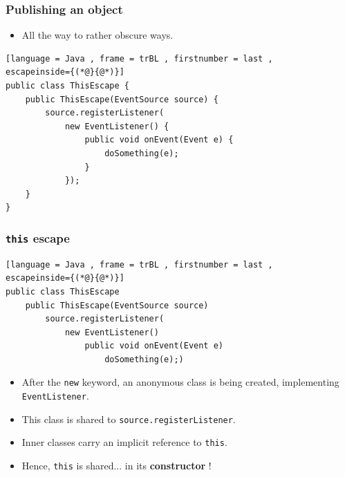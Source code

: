\documentclass[xcolor={dvipsnames,svgnames},aspectratio=169]{beamer}
\begin{document}
\begin{frame}[fragile]
  \frametitle{Publishing an object}

  \begin{itemize}
  \item[\faBook]<1-> All the way to rather obscure ways.
  \end{itemize}
\begin{lstlisting}[language = Java , frame = trBL , firstnumber = last ,
escapeinside={(*@}{@*)}]
public class ThisEscape {
    public ThisEscape(EventSource source) {
        source.registerListener(
            new EventListener() {
                public void onEvent(Event e) {
                    doSomething(e);
                }
            });
    }
}
\end{lstlisting}
\end{frame}

\begin{frame}[fragile]
  \frametitle{\texttt{this} escape}

\begin{lstlisting}[language = Java , frame = trBL , firstnumber = last ,
escapeinside={(*@}{@*)}]
public class ThisEscape
    public ThisEscape(EventSource source)
        source.registerListener(
            new EventListener()
                public void onEvent(Event e)
                    doSomething(e);)
\end{lstlisting}

  \begin{itemize}
  \item[\faBook]<1-> After the \texttt{new} keyword, an anonymous class is being
    created, implementing \texttt{EventListener}.
  \item[\faBook]<2-> This class is shared to \texttt{source.registerListener}.
  \item[\faBook]<3-> Inner classes carry an implicit reference to \texttt{this}.
  \item[\faBook]<4-> Hence, \texttt{this} is shared... \pause in its
    \textbf{constructor} \faSkullCrossbones!
  \end{itemize}
\end{frame}
\end{document}
